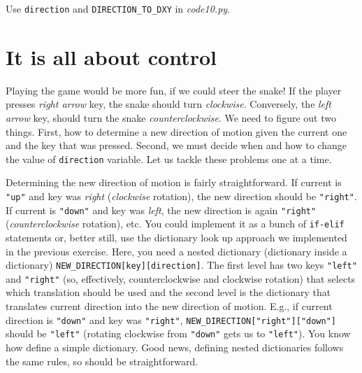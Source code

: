 \documentclass[
]{book}
\begin{document}
Use \texttt{direction} and \texttt{DIRECTION\_TO\_DXY} in \emph{code10.py}.

\hypertarget{it-is-all-about-control}{%
\section{It is all about control}\label{it-is-all-about-control}}

Playing the game would be more fun, if we could steer the snake! If the player presses \emph{right arrow} key, the snake should turn \emph{clockwise}. Conversely, the \emph{left arrow} key, should turn the snake \emph{counterclockwise}. We need to figure out two things. First, how to determine a new direction of motion given the current one and the key that was pressed. Second, we must decide when and how to change the value of \texttt{direction} variable. Let us tackle these problems one at a time.

Determining the new direction of motion is fairly straightforward. If current is \texttt{"up"} and key was \emph{right} (\emph{clockwise} rotation), the new direction should be \texttt{"right"}. If current is \texttt{"down"} and key was \emph{left}, the new direction is again \texttt{"right"} (\emph{counterclockwise} rotation), etc. You could implement it as a bunch of \texttt{if-elif} statements or, better still, use the dictionary look up approach we implemented in the previous exercise. Here, you need a nested dictionary (dictionary inside a dictionary) \texttt{NEW\_DIRECTION{[}key{]}{[}direction{]}}. The first level has two keys \texttt{"left"} and \texttt{"right"} (so, effectively, counterclockwise and clockwise rotation) that selects which translation should be used and the second level is the dictionary that translates current direction into the new direction of motion. E.g., if current direction is \texttt{"down"} and key was \texttt{"right"}, \texttt{NEW\_DIRECTION{[}"right"{]}{[}"down"{]}} should be \texttt{"left"} (rotating clockwise from \texttt{"down"} gets us to \texttt{"left"}). You know how define a simple dictionary. Good news, defining nested dictionaries follows the same rules, so should be straightforward.
\end{document}
